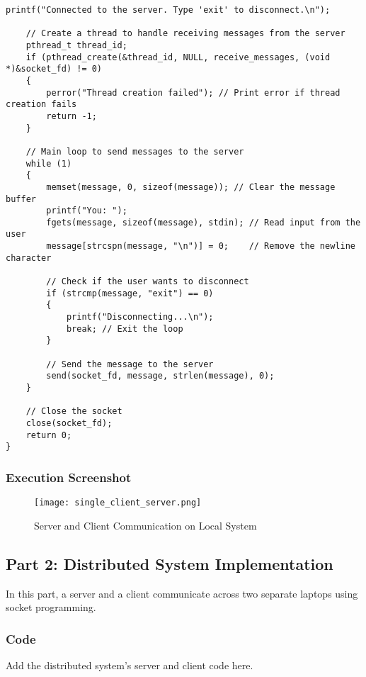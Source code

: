 \documentclass[a4paper,12pt]{article}
\begin{document}
\begin{lstlisting}[caption={Local System Client Code}, label={lst:local-client}]
    printf("Connected to the server. Type 'exit' to disconnect.\n");

    // Create a thread to handle receiving messages from the server
    pthread_t thread_id;
    if (pthread_create(&thread_id, NULL, receive_messages, (void *)&socket_fd) != 0)
    {
        perror("Thread creation failed"); // Print error if thread creation fails
        return -1;
    }

    // Main loop to send messages to the server
    while (1)
    {
        memset(message, 0, sizeof(message)); // Clear the message buffer
        printf("You: ");
        fgets(message, sizeof(message), stdin); // Read input from the user
        message[strcspn(message, "\n")] = 0;    // Remove the newline character

        // Check if the user wants to disconnect
        if (strcmp(message, "exit") == 0)
        {
            printf("Disconnecting...\n");
            break; // Exit the loop
        }

        // Send the message to the server
        send(socket_fd, message, strlen(message), 0);
    }

    // Close the socket
    close(socket_fd);
    return 0;
}

\end{lstlisting}

\subsubsection{Execution Screenshot}
\begin{figure}[h!]
    \centering
    \texttt{[image: single\_client\_server.png]}
    \caption{Server and Client Communication on Local System}
    \label{fig:local-server}
\end{figure}

\newpage

\subsection{Part 2: Distributed System Implementation}
In this part, a server and a client communicate across two separate laptops using socket programming.

\subsubsection{Code}
Add the distributed system's server and client code here.
\end{document}
